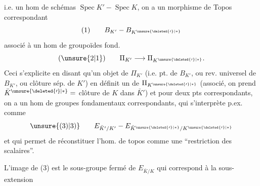 i.e. un hom de schémas $\operatorname{Spec}K' - \operatorname{Spec}K$, on a un morphisme de Topos correspondant
\[
(1)\qquad B_{K'}-B_{K^{\unsure{\deleted{\prime}|*}}}
\]
associé à un hom de groupoïdes fond.
\[
(\unsure{2|1})\qquad \Pi_{K'}\longrightarrow\Pi_{K^{\unsure{\deleted{\prime}|*}}}.
\]
Ceci s'explicite en disant qu'un  objet de $\Pi_{K'}$ (i.e. pt. de $B_{K'}$, ou rev. universel de $B_{K'}$, \deleted{)} ou clôture sép. de $K'$) en définit un de $\Pi_{K^{\unsure{\deleted{\prime}|*}}}$ (associé, on prend $\bar K^{\unsure{\deleted{\prime}|*}}=$ clôture   de $K$ dans $\bar K'$) et pour deux pts correspondants, on a un hom de groupes fondamentaux correspondants, qui s'interprète p.ex. comme
\[
\unsure{(3)|3)}\qquad E_{\bar K'/K'}-E_{\bar K^{\unsure{\deleted{\prime}|*}}/K^{\unsure{\deleted{\prime}|*}}}
\]
et qui permet de réconstituer l'hom. de topos comme une ``restriction des scalaires''.

L'image de (3) est le sous-groupe fermé de $E_{\bar K/K}$ qui correspond à la sous-extension
